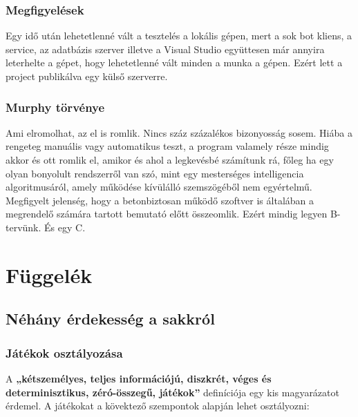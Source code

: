 \documentclass[twoside, a4paper, 12pt]{book}
\begin{document}
\section{Megfigyelések}
Egy idő után lehetetlenné vált a tesztelés a lokális gépen, mert a sok bot kliens, a service, az adatbázis szerver illetve a Visual Studio együttesen már annyira leterhelte a gépet, hogy lehetetlenné vált minden a munka a gépen. Ezért lett a project publikálva egy külső szerverre.

\section{Murphy törvénye}
Ami elromolhat, az el is romlik. Nincs száz százalékos bizonyosság sosem. Hiába a rengeteg manuális vagy automatikus teszt, a program valamely része mindig akkor és ott romlik el, amikor és ahol a legkevésbé számítunk rá, főleg ha egy olyan bonyolult rendszerről van szó, mint egy mesterséges intelligencia algoritmusáról, amely működése kívülálló szemszögéből nem egyértelmű. Megfigyelt jelenség, hogy a betonbiztosan működő szoftver is általában a megrendelő számára tartott bemutató előtt összeomlik. Ezért mindig legyen B-tervünk. És egy C.




\newpage
\part{Függelék}
\chapter{Néhány érdekesség a sakkról}
\section{Játékok osztályozása}
A \textbf{„kétszemélyes, teljes információjú, diszkrét, véges és determinisztikus, zéró-összegű, játékok”} definíciója egy kis magyarázatot érdemel. A játékokat a kövektező szempontok alapján lehet osztályozni:
\end{document}

